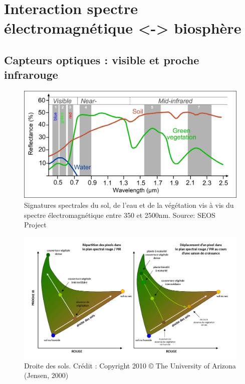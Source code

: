 \documentclass[11pt]{beamer}
\begin{document}
\section{Interaction spectre électromagnétique <-> biosphère}
\subsection{Capteurs optiques : visible et proche infrarouge}
\begin{frame}{}
\begin{figure}[!h]
\centering
\includegraphics[scale=0.38]{img/spectral_signatures.jpg}
\caption{Signatures spectrales du sol, de l'eau et de la végétation vis à vis du spectre électromagnétique entre 350 et 2500nm. Source: SEOS Project}
\label{signSpectr}
\end{figure}
\end{frame}

\begin{frame}{}
\begin{figure}[!h]
\centering
\includegraphics[scale=0.45]{img/droite_sols.png}
\caption{Droite des sols. Crédit : Copyright 2010 © The University of Arizona (Jensen, 2000)}
\label{signSpectr}
\end{figure}
\end{frame}
\end{document}

